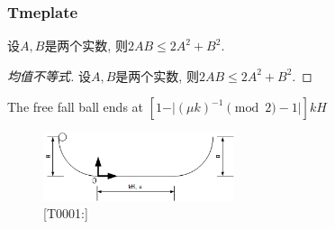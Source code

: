 \subsubsection{Tmeplate}

\begin{theorem}[均值不等式]

    设$A,B$是两个实数, 则$2AB\leq 2 A^2+B^2$.
    
\end{theorem}

\begin{proof}[均值不等式]

    设$A,B$是两个实数, 则$2AB\leq 2 A^2+B^2$.
    
\end{proof}

The free fall ball ends at $[1-\vert (\mu k)^{-1} \pmod 2 -1 \vert ]kH $

\begin{figure}[h]
    \centering
    \includegraphics[width=0.5\textwidth]{../../resources/T0001.png}
    \caption{[T0001:]}
    \label{fig:1}
\end{figure}